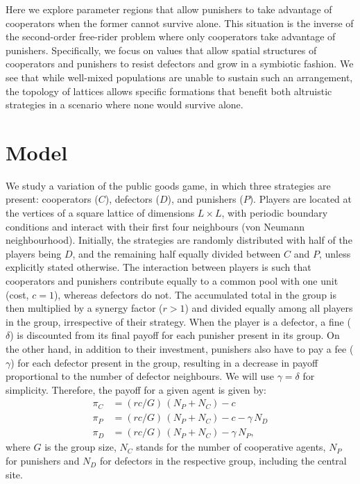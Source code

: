 \documentclass[5p]{elsarticle}
\begin{document}
Here we explore parameter regions that allow punishers to take advantage of cooperators when the former cannot survive alone. This situation is the inverse of the second-order free-rider problem where {only} cooperators take advantage of punishers.
Specifically,  we focus on values that allow spatial structures of cooperators and punishers to resist defectors and grow in a symbiotic fashion.
%
We see that while well-mixed populations are unable to sustain such an arrangement, the topology of lattices allows specific formations that benefit both altruistic strategies in a scenario where none would survive alone. 

\section{Model}
We study a variation of the public goods game, in which three strategies are present: cooperators ($ C $), defectors ($ D $), and punishers ($ P $).
%
Players are located at the vertices of a square lattice of dimensions $ L \times L $, with periodic boundary conditions and interact with their first four neighbours (von Neumann neighbourhood). Initially, the strategies are randomly distributed with half of the players being $ D $, and the remaining half equally divided between $ C $ and $ P $, unless explicitly stated otherwise.
%
The interaction between players is such that cooperators and punishers contribute equally to a common pool with one unit (cost, $ c = 1 $), whereas defectors do not. The accumulated total in the group is then multiplied by a synergy factor ($ r>1 $) and divided equally among all players in the group, irrespective of their strategy.
%
When the player is a defector, a fine ($ \delta $) is discounted from its final payoff for each punisher present in its group. On the other hand, in addition to their investment, punishers also have to pay a fee ($ \gamma $) for each defector present in the group{, resulting in a decrease in payoff proportional to the number of defector neighbours.} We will use $ \gamma = \delta $ for simplicity.
%
Therefore, the payoff for a given agent is given by:
\begin{subequations} \label{eq.pay}
\begin{align}
\pi_C &= (r c/G)\,(N_{P}+N_{C}) - c \\
\pi_P &= (r c/G)\,(N_{P}+N_{C}) - c - \gamma\,N_{D} \\ 
\pi_D &= (r c/G)\,(N_{P}+N_{C}) - \gamma\,N_{P} ,
\end{align}
\end{subequations}
where $G$ is the group size, $N_C$ stands for the number of cooperative agents, $N_P$ for punishers and $N_D$ for defectors in the respective group, {including the central site}.
\end{document}
